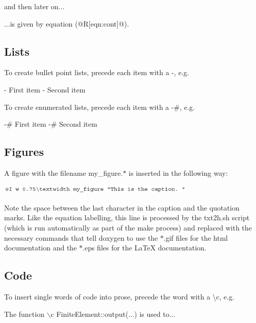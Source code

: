 and then later on... 
\begin{DoxyCode}
...is given by equation (@R[eqn:cont]@).
\end{DoxyCode}
\hypertarget{index_lists}{}\subsection{Lists}\label{index_lists}
To create bullet point lists, precede each item with a {\ttfamily -\/}, e.\+g. 
\begin{DoxyCode}
- First item
- Second item
\end{DoxyCode}
 To create enumerated lists, precede each item with a {\ttfamily -\/\#}, e.\+g. 
\begin{DoxyCode}
-# First item
-# Second item
\end{DoxyCode}
\hypertarget{index_figures}{}\subsection{Figures}\label{index_figures}
A figure with the filename {\ttfamily my\+\_\+figure}.{\ttfamily $\ast$} is inserted in the following way\+:

 
\begin{DoxyImageNoCaption}
  \mbox{\includegraphics[width=0.71\textwidth]{insert_figures}}
\end{DoxyImageNoCaption}


Note the space between the last character in the caption and the quotation marks. Like the equation labelling, this line is processed by the {\ttfamily txt2h.\+sh} script (which is run automatically as part of the {\ttfamily make} process) and replaced with the necessary commands that tell {\ttfamily doxygen} to use the {\ttfamily $\ast$}.{\ttfamily gif} files for the html documentation and the {\ttfamily $\ast$}.{\ttfamily eps} files for the {\ttfamily La\+TeX} documentation.\hypertarget{index_code}{}\subsection{Code}\label{index_code}
To insert single words of code into prose, precede the word with a {\ttfamily \textbackslash{}c}, e.\+g. 
\begin{DoxyCode}
The function \(\backslash\)c FiniteElement::output(...) is used to...
\end{DoxyCode}


